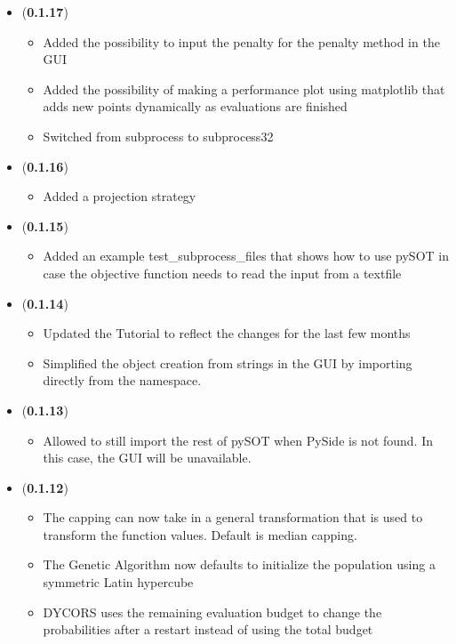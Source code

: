\documentclass[]{article}
\begin{document}
\begin{itemize}
	\item (\textbf{0.1.17})
	\begin{itemize}
		\item Added the possibility to input the penalty for the penalty method in the GUI
		\item Added the possibility of making a performance plot using matplotlib that adds new points 
		dynamically as evaluations are finished
		\item Switched from subprocess to subprocess32
	\end{itemize}

	\item (\textbf{0.1.16})
	\begin{itemize}
		\item Added a projection strategy
	\end{itemize}

	\item (\textbf{0.1.15})
	\begin{itemize}
		\item Added an example test\_subprocess\_files that shows how to use pySOT in 
		case the objective function needs to read the input from a textfile
	\end{itemize}

	\item (\textbf{0.1.14}) 
	\begin{itemize}
		\item Updated the Tutorial to reflect the changes for the last few months
		\item Simplified the object creation from strings in the GUI by importing directly from the namespace.
	\end{itemize}

	\item (\textbf{0.1.13}) 
	\begin{itemize}
		\item Allowed to still import the rest of pySOT when PySide is not found. In this case, the 
		GUI will be unavailable.
	\end{itemize}

	\item (\textbf{0.1.12}) 
	\begin{itemize}
		\item The capping can now take in a general transformation that is used to transform the function 
		values. Default is median capping.
		\item The Genetic Algorithm now defaults to initialize the population using a symmetric Latin hypercube
		\item DYCORS uses the remaining evaluation budget to change the probabilities after a restart instead 
		of using the total budget 
	\end{itemize}


\end{itemize}
\end{document}
